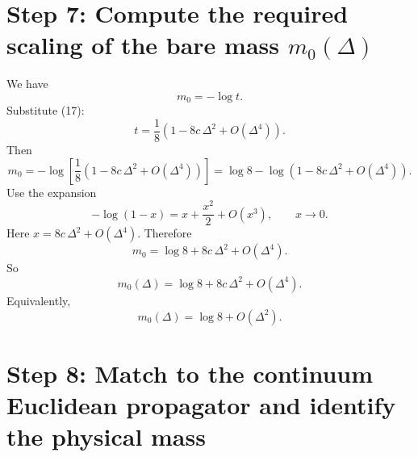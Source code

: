 \documentclass[12pt]{article}
\begin{document}
\section{Step 7: Compute the required scaling of the bare mass \(m_0(\Delta)\)}

We have
\[
m_0=-\log t.
\]
Substitute (17):
\[
t=\frac18\left(1-8c\,\Delta^2+O(\Delta^4)\right).
\]
Then
\[
m_0
=
-\log\left[\frac18\left(1-8c\,\Delta^2+O(\Delta^4)\right)\right]
=
\log 8
-
\log\left(1-8c\,\Delta^2+O(\Delta^4)\right).
\]
Use the expansion
\[
-\log(1-x)=x+\frac{x^2}{2}+O(x^3),
\qquad x\to 0.
\]
Here \(x=8c\,\Delta^2+O(\Delta^4)\). Therefore
\begin{equation}
m_0
=
\log 8
+
8c\,\Delta^2
+O(\Delta^4).
\tag{18}
\end{equation}
So
\begin{equation}
\boxed{
m_0(\Delta)
=
\log 8+8c\,\Delta^2+O(\Delta^4).
}
\tag{19}
\end{equation}
Equivalently,
\begin{equation}
\boxed{
m_0(\Delta)=\log 8+O(\Delta^2).
}
\tag{20}
\end{equation}

\section{Step 8: Match to the continuum Euclidean propagator and identify the physical mass}
\end{document}
